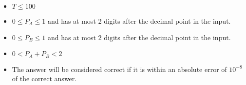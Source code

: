 \begin{itemize}
\tightlist
\item $T\le 100$
\item $0 \leq P_A \leq 1$ and has at most 2 digits after the decimal point in the input.
\item $0 \leq P_B \leq 1$ and has at most 2 digits after the decimal point in the input.
\item $0 < P_A+P_B < 2$
\item The answer will be considered correct 
      if it is within an absolute error of $10^{-8}$ of the correct answer.
\end{itemize}
